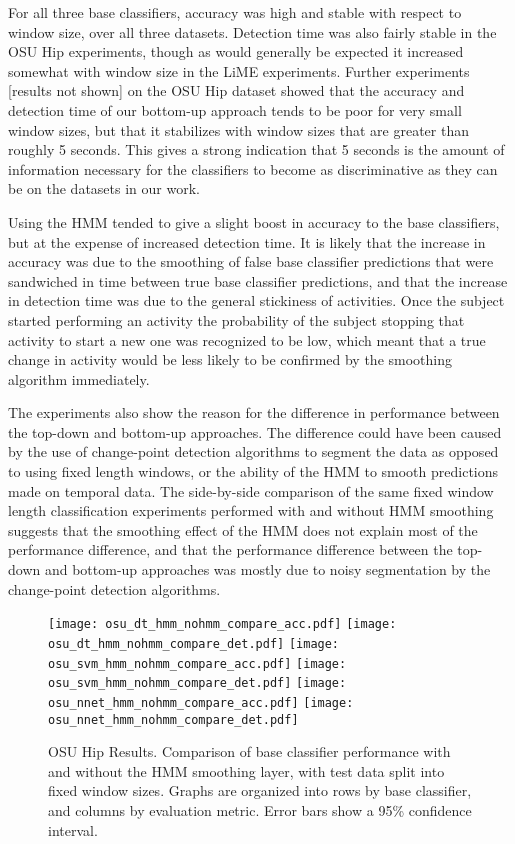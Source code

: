 For all three base classifiers, accuracy was high and
stable with respect to window size, over all three datasets. Detection
time was also fairly stable in the OSU Hip experiments, though as would
generally be expected it increased somewhat with window size in the LiME
experiments. Further experiments [results not shown] on the
OSU Hip dataset showed that the accuracy and detection time of our bottom-up approach 
tends to be poor for very small window sizes, but that it stabilizes with window sizes
that are greater than roughly 5 seconds. This gives a strong indication that
5 seconds is the amount of information necessary for the classifiers to become as
discriminative as they can be on the datasets in our work.

Using the HMM tended to give a slight boost in accuracy to the base classifiers,
but at the expense of increased detection time. It is likely that the increase
in accuracy was due to the smoothing of false base classifier predictions that
were sandwiched in time between true base classifier predictions, and that the increase in
detection time was due to the general stickiness of activities. Once the
subject started performing an activity the probability of the subject stopping
that activity to start a new one was recognized to be low, which meant that a true change in
activity would be less likely to be confirmed by the smoothing algorithm
immediately.

The experiments also show the reason for the difference in
performance between the top-down and bottom-up approaches. 
The difference could have been caused by the
use of change-point detection algorithms to segment the data as opposed to using
fixed length windows, or the ability of the HMM
to smooth predictions made on temporal data. The side-by-side comparison of the
same fixed window length classification experiments performed with and without HMM smoothing
suggests that the smoothing effect of the HMM
does not explain most of the performance difference, and that the performance difference between the top-down
and bottom-up approaches was mostly due to noisy segmentation by the change-point
detection algorithms.

\begin{figure}[H]
 \centering
 \texttt{[image: osu\_dt\_hmm\_nohmm\_compare\_acc.pdf]} \hspace{1em}\vspace{1em}
 \texttt{[image: osu\_dt\_hmm\_nohmm\_compare\_det.pdf]} 
 \texttt{[image: osu\_svm\_hmm\_nohmm\_compare\_acc.pdf]} \hspace{1em}\vspace{1em}
 \texttt{[image: osu\_svm\_hmm\_nohmm\_compare\_det.pdf]}
 \texttt{[image: osu\_nnet\_hmm\_nohmm\_compare\_acc.pdf]} \hspace{1em}
 \texttt{[image: osu\_nnet\_hmm\_nohmm\_compare\_det.pdf]}
 \caption{OSU Hip Results. Comparison of base classifier performance with and without the HMM
  smoothing layer, with test data split into fixed window sizes. Graphs are organized into rows by base
  classifier, and columns by evaluation metric. Error bars show a 95\% confidence interval.}
 \label{fig:osu_hmm}
\end{figure}

